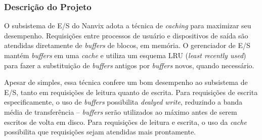\documentclass[11pt]{article}
\newif\ifbr
\newif\ifen
\begin{document}
\else\ifen
	\subsubsection*{Background}

		Among the several existing I/O devices, one can point out
		storage devices as one of the most important. They provide a
		place in which the user can persist some data and the operating
		system may use to implement virtual memory.

		However, these devices have the drawback of presenting slow
		read/write ratios, thereby yielding to poor performance. For
		instance, a single read request may take up to 30 ms, in
		contrast to 1 ms for the same request in memory. The rationale
		behind this comes from the fact that storage devices are
		essentially mechanical devices.

		For this reason, and to address performance issues, techniques
		such as request scheduling, disk block caching and disk block
		prefetching are frequently employed. In the first technique,
		read/write requests are scheduled so as to minimize the
		repositioning time of the disk arm/head. In the second
		technique, most used blocks are kept in a in-core memory, so
		that requests on these blocks can be served faster. Finally, in
		the third technique data is read in advance to the in-core disk
		block buffer, thereby speeding up linear read requests.

\fi\fi

\ifbr
	\subsubsection*{Descrição do Projeto}

		O subsistema de E/S do Nanvix adota a técnica de
		\textit{caching} para maximizar seu desempenho. Requisições
		entre processos de usuário e dispositivos de saída são atendidas
		diretamente de \textit{buffers} de blocos, em memória. O
		gerenciador de E/S mantém \textit{buffers} em uma \textit{cache}
		e utiliza um esquema LRU (\textit{least recently used}) para
		fazer a substituição de \textit{buffers} antigos por
		\textit{buffers} novos, quando necessário.

		Apesar de simples, essa técnica confere um bom desempenho ao
		subsistema de E/S, tanto em requisições de leitura quanto de
		escrita. Para requisições de escrita especificamente, o uso de
		\textit{buffers} possibilita \textit{dealyed write}, reduzindo a
		banda média de transferência -- \textit{buffers} serão
		utilizados ao máximo antes de serem escritos de volta em disco.
		Para requisições de leitura e escrita, o uso da \textit{cache}
		possibilita que requisições sejam atendidas mais prontamente.
\end{document}
